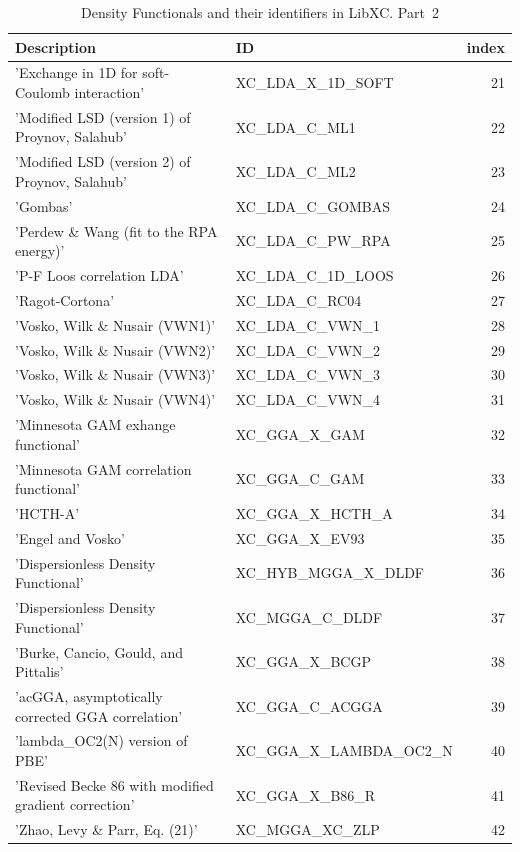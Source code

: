 \documentclass[final,12pt]{article}
\begin{document}
{{{{{{\begin{table}[!h]
\caption{Density Functionals and their identifiers in LibXC. Part~2}
\begin{center}
\begin{tabular}{llr}
\hline
\hline
Description & ID & index\\
\hline
  'Exchange in 1D for soft-Coulomb interaction' & XC\_LDA\_X\_1D\_SOFT  &21\\
  'Modified LSD (version 1) of Proynov, Salahub' & XC\_LDA\_C\_ML1  & 22\\
  'Modified LSD (version 2) of Proynov, Salahub' & XC\_LDA\_C\_ML2  & 23\\
  'Gombas' & XC\_LDA\_C\_GOMBAS  & 24\\
  'Perdew \& Wang (fit to the RPA energy)' & XC\_LDA\_C\_PW\_RPA  & 25\\
  'P-F Loos correlation LDA' & XC\_LDA\_C\_1D\_LOOS  & 26\\
  'Ragot-Cortona' & XC\_LDA\_C\_RC04  & 27\\
  'Vosko, Wilk \& Nusair (VWN1)' & XC\_LDA\_C\_VWN\_1  & 28\\
  'Vosko, Wilk \& Nusair (VWN2)' & XC\_LDA\_C\_VWN\_2  & 29\\
  'Vosko, Wilk \& Nusair (VWN3)' & XC\_LDA\_C\_VWN\_3  & 30\\
  'Vosko, Wilk \& Nusair (VWN4)' & XC\_LDA\_C\_VWN\_4  & 31\\
  'Minnesota GAM exhange functional' & XC\_GGA\_X\_GAM  & 32\\
  'Minnesota GAM correlation functional' & XC\_GGA\_C\_GAM  & 33\\
  'HCTH-A' & XC\_GGA\_X\_HCTH\_A  & 34\\
  'Engel and Vosko' & XC\_GGA\_X\_EV93  & 35\\
  'Dispersionless Density Functional' & XC\_HYB\_MGGA\_X\_DLDF  & 36\\
  'Dispersionless Density Functional' & XC\_MGGA\_C\_DLDF  & 37\\
  'Burke, Cancio, Gould, and Pittalis' & XC\_GGA\_X\_BCGP  & 38\\
  'acGGA, asymptotically corrected GGA correlation' & XC\_GGA\_C\_ACGGA  & 39\\
  'lambda\_OC2(N) version of PBE' & XC\_GGA\_X\_LAMBDA\_OC2\_N  & 40\\
  'Revised Becke 86 with modified gradient correction' & XC\_GGA\_X\_B86\_R  & 41\\
  'Zhao, Levy \& Parr, Eq. (21)' & XC\_MGGA\_XC\_ZLP  & 42\\

\end{tabular}
\end{center}
\end{table}}}}}}}
\end{document}

